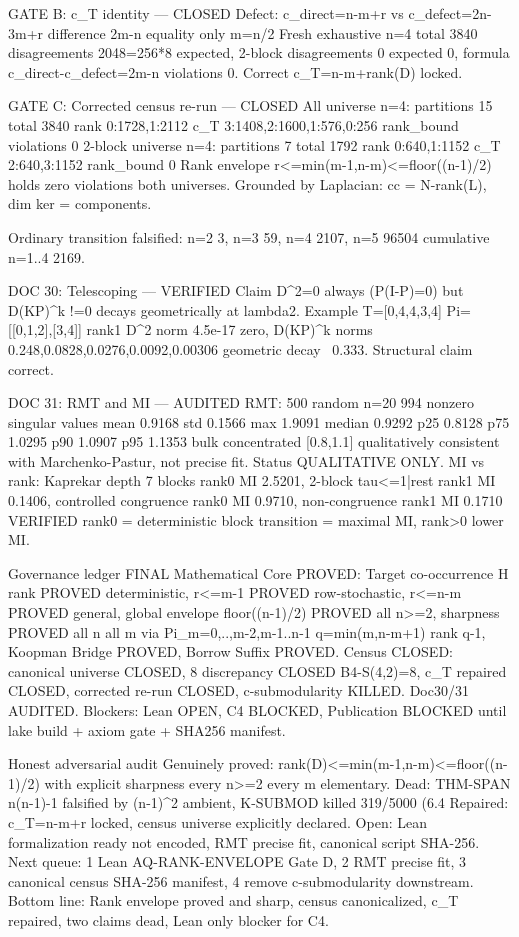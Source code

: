 GATE B: c_T identity — CLOSED
Defect: c_direct=n-m+r vs c_defect=2n-3m+r difference 2m-n equality only m=n/2
Fresh exhaustive n=4 total 3840 disagreements 2048=256*8 expected, 2-block disagreements 0 expected 0, formula c_direct-c_defect=2m-n violations 0. Correct c_T=n-m+rank(D) locked.

GATE C: Corrected census re-run — CLOSED
All universe n=4: partitions 15 total 3840 rank {0:1728,1:2112} c_T {3:1408,2:1600,1:576,0:256} rank_bound violations 0
2-block universe n=4: partitions 7 total 1792 rank {0:640,1:1152} c_T {2:640,3:1152} rank_bound 0
Rank envelope r<=min(m-1,n-m)<=floor((n-1)/2) holds zero violations both universes. Grounded by Laplacian: cc = N-rank(L), dim ker = components.

Ordinary transition falsified: n=2 3, n=3 59, n=4 2107, n=5 96504 cumulative n=1..4 2169.

DOC 30: Telescoping — VERIFIED
Claim D^2=0 always (P(I-P)=0) but D(KP)^k !=0 decays geometrically at lambda2.
Example T=[0,4,4,3,4] Pi=[[0,1,2],[3,4]] rank1 D^2 norm 4.5e-17 zero, D(KP)^k norms 0.248,0.0828,0.0276,0.0092,0.00306 geometric decay ~0.333. Structural claim correct.

DOC 31: RMT and MI — AUDITED
RMT: 500 random n=20 994 nonzero singular values mean 0.9168 std 0.1566 max 1.9091 median 0.9292 p25 0.8128 p75 1.0295 p90 1.0907 p95 1.1353 bulk concentrated [0.8,1.1] qualitatively consistent with Marchenko-Pastur, not precise fit. Status QUALITATIVE ONLY.
MI vs rank: Kaprekar depth 7 blocks rank0 MI 2.5201, 2-block tau<=1|rest rank1 MI 0.1406, controlled congruence rank0 MI 0.9710, non-congruence rank1 MI 0.1710 VERIFIED rank0 = deterministic block transition = maximal MI, rank>0 lower MI.

Governance ledger FINAL
Mathematical Core PROVED: Target co-occurrence H rank PROVED deterministic, r<=m-1 PROVED row-stochastic, r<=n-m PROVED general, global envelope floor((n-1)/2) PROVED all n>=2, sharpness PROVED all n all m via Pi_m={{0},..,{m-2},{m-1..n-1}} q=min(m,n-m+1) rank q-1, Koopman Bridge PROVED, Borrow Suffix PROVED.
Census CLOSED: canonical universe CLOSED, 8 discrepancy CLOSED B4-S(4,2)=8, c_T repaired CLOSED, corrected re-run CLOSED, c-submodularity KILLED.
Doc30/31 AUDITED.
Blockers: Lean OPEN, C4 BLOCKED, Publication BLOCKED until lake build + axiom gate + SHA256 manifest.

Honest adversarial audit
Genuinely proved: rank(D)<=min(m-1,n-m)<=floor((n-1)/2) with explicit sharpness every n>=2 every m elementary.
Dead: THM-SPAN n(n-1)-1 falsified by (n-1)^2 ambient, K-SUBMOD killed 319/5000 (6.4%
Repaired: c_T=n-m+r locked, census universe explicitly declared.
Open: Lean formalization ready not encoded, RMT precise fit, canonical script SHA-256.
Next queue: 1 Lean AQ-RANK-ENVELOPE Gate D, 2 RMT precise fit, 3 canonical census SHA-256 manifest, 4 remove c-submodularity downstream.
Bottom line: Rank envelope proved and sharp, census canonicalized, c_T repaired, two claims dead, Lean only blocker for C4.

